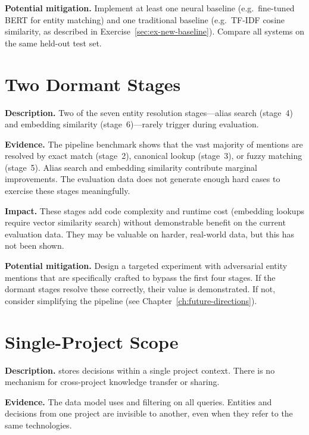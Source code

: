 \medskip\noindent\textbf{Potential mitigation.}
Implement at least one neural baseline (e.g.\ fine-tuned BERT for entity
matching) and one traditional baseline (e.g.\ TF-IDF cosine similarity,
as described in Exercise~\ref{sec:ex-new-baseline}).  Compare all systems
on the same held-out test set.


\section{Two Dormant Stages}
\label{sec:lim-dormant-stages}

\noindent\textbf{Description.}
Two of the seven entity resolution stages---alias search (stage~4) and
embedding similarity (stage~6)---rarely trigger during evaluation.

\medskip\noindent\textbf{Evidence.}
The pipeline benchmark shows that the vast majority of mentions are
resolved by exact match (stage~2), canonical lookup (stage~3), or fuzzy
matching (stage~5).  Alias search and embedding similarity contribute
marginal improvements.  The evaluation data does not generate enough
hard cases to exercise these stages meaningfully.

\medskip\noindent\textbf{Impact.}
These stages add code complexity and runtime cost (embedding lookups
require vector similarity search) without demonstrable benefit on the
current evaluation data.  They may be valuable on harder, real-world data,
but this has not been shown.

\medskip\noindent\textbf{Potential mitigation.}
Design a targeted experiment with adversarial entity mentions that are
specifically crafted to bypass the first four stages.  If the dormant
stages resolve these correctly, their value is demonstrated.  If not,
consider simplifying the pipeline (see
Chapter~\ref{ch:future-directions}).


\section{Single-Project Scope}
\label{sec:lim-single-project}

\noindent\textbf{Description.}
\sysname{} stores decisions within a single project context.  There is no
mechanism for cross-project knowledge transfer or sharing.

\medskip\noindent\textbf{Evidence.}
The data model uses  and  filtering on all
queries.  Entities and decisions from one project are invisible to
another, even when they refer to the same technologies.

